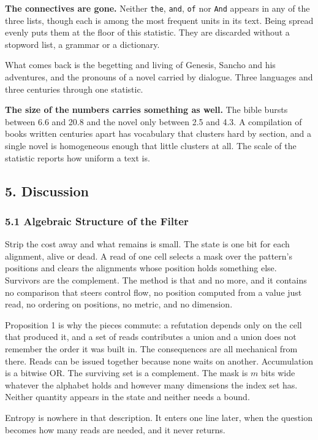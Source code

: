 \noindent\textbf{The connectives are gone.} Neither \texttt{the}, \texttt{and}, \texttt{of} nor \texttt{And} appears in any of the three lists, though each is among the most frequent units in its text. Being spread evenly puts them at the floor of this statistic. They are discarded without a stopword list, a grammar or a dictionary.

What comes back is the begetting and living of Genesis, Sancho and his adventures, and the pronouns of a novel carried by dialogue. Three languages and three centuries through one statistic.

\noindent\textbf{The size of the numbers carries something as well.} The bible bursts between 6.6 and 20.8 and the novel only between 2.5 and 4.3. A compilation of books written centuries apart has vocabulary that clusters hard by section, and a single novel is homogeneous enough that little clusters at all. The scale of the statistic reports how uniform a text is.

\subsection{5. Discussion}

\subsubsection{5.1 Algebraic Structure of the Filter}

Strip the cost away and what remains is small. The state is one bit for each alignment, alive or dead. A read of one cell selects a mask over the pattern's positions and clears the alignments whose position holds something else. Survivors are the complement. The method is that and no more, and it contains no comparison that steers control flow, no position computed from a value just read, no ordering on positions, no metric, and no dimension.

Proposition 1 is why the pieces commute: a refutation depends only on the cell that produced it, and a set of reads contributes a union and a union does not remember the order it was built in. The consequences are all mechanical from there. Reads can be issued together because none waits on another. Accumulation is a bitwise OR. The surviving set is a complement. The mask is \(m\) bits wide whatever the alphabet holds and however many dimensions the index set has. Neither quantity appears in the state and neither needs a bound.

Entropy is nowhere in that description. It enters one line later, when the question becomes how many reads are needed, and it never returns.

